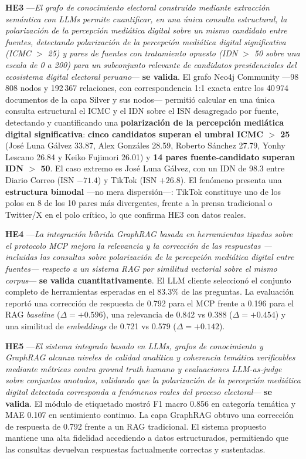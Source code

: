 \textbf{HE3} —\textit{El grafo de conocimiento electoral construido mediante extracción semántica con LLMs permite cuantificar, en una única consulta estructural, la polarización de la percepción mediática digital sobre un mismo candidato entre fuentes, detectando polarización de la percepción mediática digital significativa (ICMC $>$ 25) y pares de fuentes con tratamiento opuesto (IDN $>$ 50 sobre una escala de 0 a 200) para un subconjunto relevante de candidatos presidenciales del ecosistema digital electoral peruano}— \textbf{se valida}. El grafo Neo4j Community —98\,808 nodos y 192\,367 relaciones, con correspondencia 1:1 exacta entre los 40\,974 documentos de la capa Silver y sus nodos— permitió calcular en una única consulta estructural el ICMC y el IDN sobre el ISN desagregado por fuente, detectando y cuantificando una \textbf{polarización de la percepción mediática digital significativa}: \textbf{cinco candidatos superan el umbral ICMC $>$ 25} (José Luna Gálvez 33.87, Alex Gonzáles 28.59, Roberto Sánchez 27.79, Yonhy Lescano 26.84 y Keiko Fujimori 26.01) y \textbf{14 pares fuente-candidato superan IDN $>$ 50}. El caso extremo es José Luna Gálvez, con un IDN de 98.3 entre Diario Correo (ISN $-71.4$) y TikTok (ISN $+26.8$). El fenómeno presenta una \textbf{estructura bimodal} —no mera dispersión—: TikTok constituye uno de los polos en 8 de los 10 pares más divergentes, frente a la prensa tradicional o Twitter/X en el polo crítico, lo que confirma HE3 con datos reales.

\textbf{HE4} —\textit{La integración híbrida GraphRAG basada en herramientas tipadas sobre el protocolo MCP mejora la relevancia y la corrección de las respuestas —incluidas las consultas sobre polarización de la percepción mediática digital entre fuentes— respecto a un sistema RAG por similitud vectorial sobre el mismo corpus}— \textbf{se valida cuantitativamente}. El LLM cliente seleccionó el conjunto completo de herramientas esperadas en el 83.3\% de las preguntas. La evaluación reportó una corrección de respuesta de 0.792 para el MCP frente a 0.196 para el RAG \textit{baseline} ($\Delta=+0.596$), una relevancia de 0.842 vs 0.388 ($\Delta=+0.454$) y una similitud de \textit{embeddings} de 0.721 vs 0.579 ($\Delta=+0.142$).

\textbf{HE5} —\textit{El sistema integrado basado en LLMs, grafos de conocimiento y GraphRAG alcanza niveles de calidad analítica y coherencia temática verificables mediante métricas contra ground truth humano y evaluaciones LLM-as-judge sobre conjuntos anotados, validando que la polarización de la percepción mediática digital detectada corresponda a fenómenos reales del proceso electoral}— \textbf{se valida}. El módulo de etiquetado mostró F1 macro 0.856 en categoría temática y MAE 0.107 en sentimiento continuo. La capa GraphRAG obtuvo una corrección de respuesta de 0.792 frente a un RAG tradicional. El sistema propuesto mantiene una alta fidelidad accediendo a datos estructurados, permitiendo que las consultas devuelvan respuestas factualmente correctas y sustentadas.

